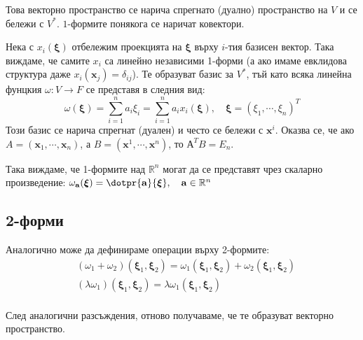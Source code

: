\documentclass[12pt]{article}
\newcommand\func[3]{#1:#2 \to #3}
\newcommand\nstfunc[1]{\func{#1}{V}{F}}
\newcommand\myxi[0]{\boldsymbol{\xi}}
\begin{document}
\begin{large}
  Това векторно пространство се нарича спрегнато (дуално) пространство на $V$ и се бележи с $V^{*}$. $1$-формите понякога се наричат ковектори.

  Нека с $x_i(\myxi)$ отбележим проекцията на $\myxi$ върху $i$-тия базисен вектор. Така виждаме, че  самите $x_i$ са линейно независими 1-форми (а ако имаме евклидова структура даже $x_i (\mathbf{x}_j) = \delta_{ij}$). Те образуват базис за $V^{*}$, тъй като всяка линейна фунцкия $\nstfunc{\omega}$ се представя в следния вид:
  \begin{equation*}
    \omega(\myxi) = \sum_{i=1}^{n} a_{i} \xi_{i} = \sum_{i=1}^{n} a_{i} x_{i} (\myxi), \quad \myxi=(\xi_1,\cdots,\xi_n)^{T}
  \end{equation*}
  Този базис се нарича спрегнат (дуален) и често се бележи с $\mathbf{x}^i$. Оказва се, че ако $A=(\mathbf{x}_1,\cdots,\mathbf{x}_n)$, а $B=(\mathbf{x}^1,\cdots,\mathbf{x}^n)$, то $А^T B = E_n$.

  Така виждаме, че 1-формите над $\mathbb{R}^n$ могат да се представят чрез скаларно произведение: $\omega_{\mathbf{a}}(\myxi)=\dotpr{\mathbf{a}}{\myxi}, \quad \mathbf{a} \in \mathbb{R}^n$

  \subsection{2-форми}
  Аналогично може да дефинираме операции върху 2-формите:
  \begin{align*}
    &(\omega_1+\omega_2)(\myxi_1,\myxi_2)=\omega_1(\myxi_1,\myxi_2)+\omega_2(\myxi_1,\myxi_2) \\
    &(\lambda\omega_1)(\myxi_1,\myxi_2)=\lambda\omega_1(\myxi_1,\myxi_2) \\
  \end{align*}

  След аналогични разсъждения, отново получаваме, че те образуват векторно пространство.


\end{large}
\end{document}
